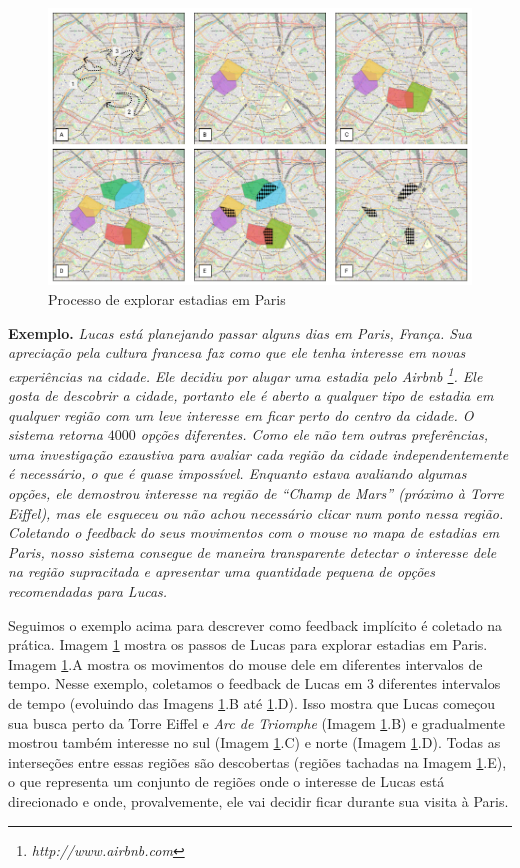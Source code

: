 \begin{figure}[t]
	\centering
	\includegraphics[width=\textwidth]{imagens/caso-de-estudo}
	\caption{Processo de explorar estadias em Paris}
	\label{fig:regions}
\end{figure}

{\bf Exemplo.} {\em Lucas está planejando passar alguns dias em Paris, França. Sua apreciação pela cultura francesa faz como que ele tenha interesse em novas experiências na cidade. Ele decidiu por alugar uma estadia pelo Airbnb \footnote{\it http://www.airbnb.com}. Ele gosta de descobrir a cidade, portanto ele é aberto a qualquer tipo de estadia em qualquer região com um leve interesse em ficar perto do centro da cidade. O sistema retorna $4000$ opções diferentes. Como ele não tem outras preferências, uma investigação exaustiva para avaliar cada região da cidade independentemente é necessário, o que é quase impossível. Enquanto estava avaliando algumas opções, ele demostrou interesse na região de  ``Champ de Mars'' (próximo à Torre Eiffel), mas ele esqueceu ou não achou necessário clicar num ponto nessa região. Coletando o feedback do seus movimentos com o mouse no mapa de estadias em Paris, nosso sistema consegue de maneira transparente detectar o interesse dele na região supracitada e apresentar uma quantidade pequena de opções recomendadas para Lucas.}

Seguimos o exemplo acima para descrever como feedback implícito é coletado na prática. Imagem \ref{fig:regions} mostra os passos de Lucas para explorar estadias em Paris. Imagem \ref{fig:regions}.A mostra os movimentos do mouse dele em diferentes intervalos de tempo. Nesse exemplo, coletamos o feedback de Lucas em 3 diferentes intervalos de tempo (evoluindo das Imagens \ref{fig:regions}.B até \ref{fig:regions}.D). Isso mostra que Lucas começou sua busca perto da Torre Eiffel e {\em Arc de Triomphe} (Imagem \ref{fig:regions}.B) e gradualmente mostrou também interesse no sul (Imagem \ref{fig:regions}.C) e norte (Imagem \ref{fig:regions}.D). Todas as interseções entre essas regiões são descobertas (regiões tachadas na Imagem \ref{fig:regions}.E), o que representa um conjunto de regiões onde o interesse de Lucas está direcionado e onde, provalvemente, ele vai decidir ficar durante sua visita à Paris.

